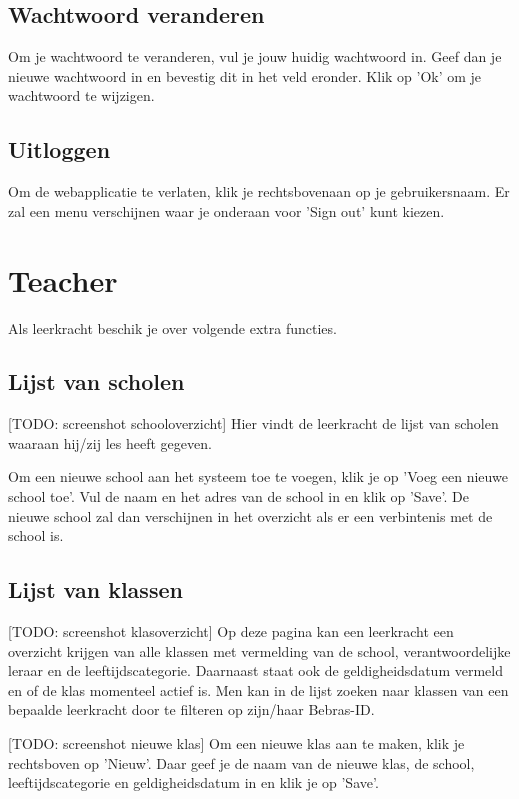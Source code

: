 \documentclass[]{article}
\begin{document}
\subsection{Wachtwoord veranderen}
Om je wachtwoord te veranderen, vul je jouw huidig wachtwoord in. Geef dan je nieuwe wachtwoord in en bevestig dit in het veld eronder. Klik op 'Ok' om je wachtwoord te wijzigen.

\subsection{Uitloggen}
Om de webapplicatie te verlaten, klik je rechtsbovenaan op je gebruikersnaam. Er zal een menu verschijnen waar je onderaan voor 'Sign out' kunt kiezen.

\section{Teacher}

Als leerkracht beschik je over volgende extra functies.

\subsection{Lijst van scholen}

[TODO: screenshot schooloverzicht]
Hier vindt de leerkracht de lijst van scholen waaraan hij/zij les heeft gegeven.

Om een nieuwe school aan het systeem toe te voegen, klik je op 'Voeg een nieuwe school toe'. Vul de naam en het adres van de school in en klik op 'Save'. De nieuwe school zal dan verschijnen in het overzicht als er een verbintenis met de school is.

\subsection{Lijst van klassen}

[TODO: screenshot klasoverzicht]
Op deze pagina kan een leerkracht een overzicht krijgen van alle klassen met vermelding van de school, verantwoordelijke leraar en de leeftijdscategorie. Daarnaast staat ook de geldigheidsdatum vermeld en of de klas momenteel actief is.
Men kan in de lijst zoeken naar klassen van een bepaalde leerkracht door te filteren op zijn/haar Bebras-ID.

[TODO: screenshot nieuwe klas]
Om een nieuwe klas aan te maken, klik je rechtsboven op 'Nieuw'. Daar geef je de naam van de nieuwe klas, de school, leeftijdscategorie en geldigheidsdatum in en klik je op 'Save'.
\end{document}
